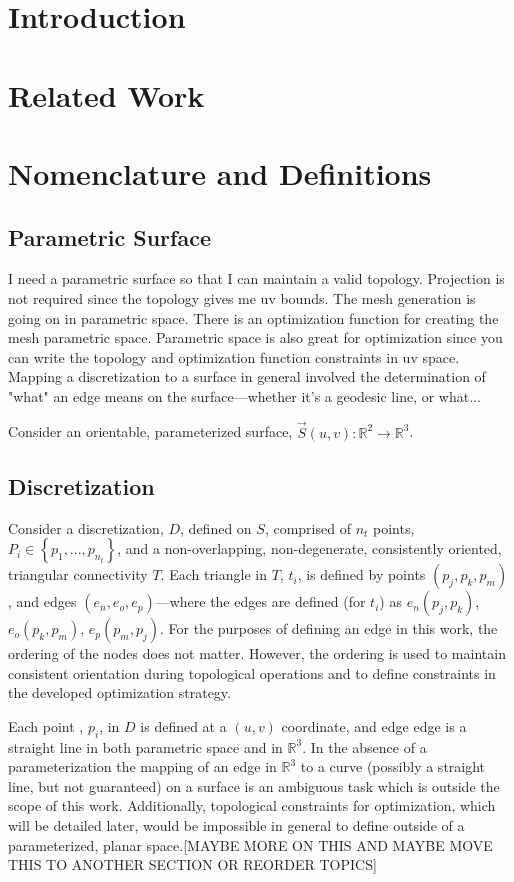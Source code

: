\documentclass[11pt]{article}
\begin{document}
\section{Introduction}

\section{Related Work}

\section{Nomenclature and Definitions}
\subsection{Parametric Surface}
I need a parametric surface so that I can maintain a valid topology.
Projection is not required since the topology gives me uv bounds. The
mesh generation is going on in parametric space. There is an
optimization function for creating the mesh parametric space. Parametric
space is also great for optimization since you can write the topology
and optimization function constraints in uv space. Mapping a
discretization to a surface in general involved the determination of
"what" an edge means on the surface---whether it's a geodesic line, or
what...

Consider an orientable, parameterized surface, $\vec{S}\left(u,v\right)
  : {\mathbb R}^2 \rightarrow {\mathbb R}^3$.
\subsection{Discretization}
Consider a discretization, $D$, defined on $S$, comprised of $n_t$
points, $P_i \in \left\{p_1,...,p_{n_t} \right\}$, and a
non-overlapping, non-degenerate, consistently oriented, triangular
connectivity $T$. Each triangle in $T$, $t_i$, is defined by points
$\left(p_j, p_k, p_m\right)$, and edges $\left(e_n, e_o,
e_p\right)$---where the edges are defined (for $t_i$) as $e_n
\left(p_j, p_k\right)$, $e_o \left(p_k, p_m\right)$, $e_p \left(p_m,
p_j\right)$. For the purposes of defining an edge in this work, the
ordering of the nodes does not matter. However, the ordering is used to
maintain consistent orientation during topological operations and to
define constraints in the developed optimization strategy.

Each point , $p_i$, in $D$ is defined at a $\left(u,v\right)$
coordinate, and edge edge is a straight line in both parametric space
and in ${\mathbb R}^3$. In the absence of a parameterization the mapping
of an edge in ${\mathbb R}^3$ to a curve (possibly a straight line, but
not guaranteed) on a surface is an ambiguous task which is outside
the scope of this work. Additionally, topological constraints for
optimization, which will be detailed later, would be impossible in
general to define outside of a parameterized, planar space.[MAYBE MORE
ON THIS AND MAYBE MOVE THIS TO ANOTHER SECTION OR REORDER TOPICS]
\end{document}
